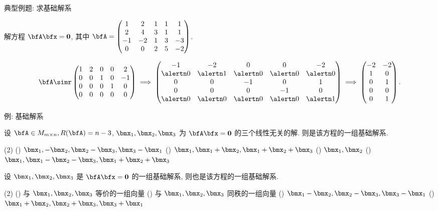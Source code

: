 \begin{frame}{典型例题: 求基础解系}
	\onslide<+->
	\begin{exercise}
		解方程 $\bfA\bfx={\bf0}$, 其中 $\bfA=\begin{pmatrix}
			1&2&1&1&1\\
			2&4&3&1&1\\
			-1&-2&1&3&-3\\
			0&0&2&5&-2
		\end{pmatrix}$.
	\end{exercise}
	\onslide<+->
	\begin{answer}
		\[\bfA\simr\begin{pmatrix}
			1&2&0&0&2\\
			0&0&1&0&-1\\
			0&0&0&1&0\\
			0&0&0&0&0
		\end{pmatrix}\implies\begin{pmatrix}
			-1&-2&0&0&-2\\
			\alertn0&\alertn1&\alertn0&\alertn0&\alertn0\\
			0&0&-1&0&1\\
			0&0&0&-1&0\\
			\alertn0&\alertn0&\alertn0&\alertn0&\alertn1
		\end{pmatrix}\implies\begin{pmatrix}
			-2&-2\\
			1&0\\
			0&1\\
			0&0\\
			0&1
		\end{pmatrix}.\]
	\end{answer}
\end{frame}


\begin{frame}{例: 基础解系}
	\onslide<+->
	\begin{example}
		设 $\bfA\in M_{m\times n}, R(\bfA)=n-3$, $\bmx_1,\bmx_2,\bmx_3$ 为 $\bfA\bfx={\bf0}$ 的三个线性无关的解.
		则是该方程的一组基础解系.
		\begin{taskschoice}(2)
			() $\bmx_1,-\bmx_2,\bmx_2-\bmx_3,\bmx_3-\bmx_1$
			() $\bmx_1,\bmx_1+\bmx_2,\bmx_1+\bmx_2+\bmx_3$
			() $\bmx_1,\bmx_2$
			() $\bmx_1,\bmx_1-\bmx_2-\bmx_3,\bmx_1+\bmx_2+\bmx_3$
		\end{taskschoice}
	\end{example}
	\onslide<+->
	\begin{exercise}
		设 $\bmx_1,\bmx_2,\bmx_3$ 是 $\bfA\bfx={\bf0}$ 的一组基础解系, 则也是该方程的一组基础解系.
		\begin{taskschoice}(2)
			() 与 $\bmx_1,\bmx_2,\bmx_3$ 等价的一组向量
			() 与 $\bmx_1,\bmx_2,\bmx_3$ 同秩的一组向量
			() $\bmx_1-\bmx_2,\bmx_2-\bmx_3,\bmx_3-\bmx_1$
			() $\bmx_1+\bmx_2,\bmx_2+\bmx_3,\bmx_3+\bmx_1$
		\end{taskschoice}
	\end{exercise}
\end{frame}


